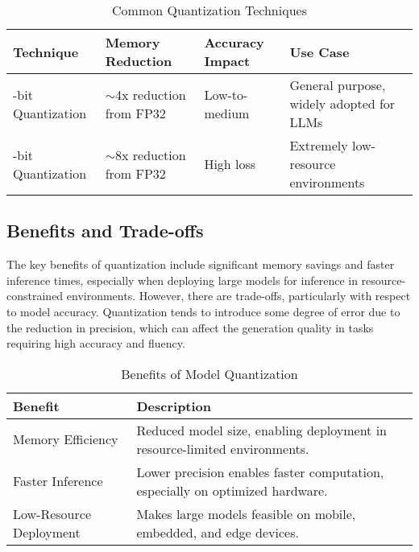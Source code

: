 \begin{table}[H]
  \centering
  \scriptsize
  \renewcommand{\arraystretch}{1.3}
  \begin{tabularx}{0.95\textwidth}{
    >{\raggedright\arraybackslash}p{3.5cm}
    >{\centering\arraybackslash}p{3.5cm}
    >{\centering\arraybackslash}p{3cm}
    >{\raggedright\arraybackslash}X
  }
    \toprule
    \textbf{Technique} & \textbf{Memory Reduction} & \textbf{Accuracy Impact} & \textbf{Use Case} \\
    \midrule
    8-bit Quantization & $\sim$4x reduction from FP32 & Low-to-medium & General purpose, widely adopted for LLMs \\
    4-bit Quantization & $\sim$8x reduction from FP32 & High loss & Extremely low-resource environments \\
    \bottomrule
  \end{tabularx}
  \caption{Common Quantization Techniques}
\end{table}

\subsection{Benefits and Trade-offs}

The key benefits of quantization include significant memory savings and faster inference
times, especially when deploying large models for inference in resource-constrained environments.
However, there are trade-offs, particularly with respect to model accuracy.
Quantization tends to introduce some degree of error due to the reduction in precision,
which can affect the generation quality in tasks requiring high accuracy and fluency.

\noindent
\begin{table}[H]
  \centering
  \scriptsize
  \renewcommand{\arraystretch}{1.3}
  \begin{tabularx}{0.95\textwidth}{
    >{\raggedright\arraybackslash}p{5cm}
    >{\raggedright\arraybackslash}X
  }
    \toprule
    \textbf{Benefit} & \textbf{Description} \\
    \midrule
    Memory Efficiency & Reduced model size, enabling deployment in resource-limited environments. \\
    Faster Inference & Lower precision enables faster computation, especially on optimized hardware. \\
    Low-Resource Deployment & Makes large models feasible on mobile, embedded, and edge devices. \\
    \bottomrule
  \end{tabularx}
  \caption{Benefits of Model Quantization}
\end{table}

